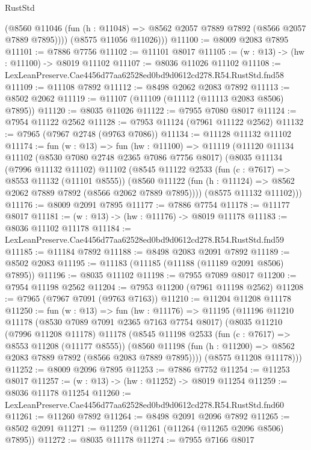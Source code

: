 \begin{lexlean}{RustStd}
\begin{coremodule}
          (@8560 @11046 (fun (h : @11048) => @8562 @2057 @7889 @7892 (@8566 @2057 @7889 @7895))))
        (@8575 @11056 @11026)))
@11100 := @8009 @2083 @7895
@11101 := @7886 @7756
@11102 := @11101 @8017
@11105 := (w : @13) -> (hw : @11100) -> @8019 @11102
@11107 := @8036 @11026 @11102
@11108 := LexLeanPreserve.Cae4456d77aa62528ed0bd9d0612cd278.R54.RustStd.fnd58
@11109 := @11108 @7892
@11112 := @8498 @2062 @2083 @7892
@11113 := @8502 @2062
@11119 := @11107 (@11109 (@11112 (@11113 @2083 @8506) @7895))
@11120 := @8035 @11026
@11122 := @7955 @7080 @8017
@11124 := @7954 @11122 @2562
@11128 := @7953 @11124 (@7961 @11122 @2562)
@11132 := @7965 (@7967 @2748 (@9763 @7086))
@11134 := @11128 @11132 @11102
@11174 := fun (w : @13) =>
  fun (hw : @11100) =>
  @11119
    (@11120
      @11134
      @11102
      (@8530 @7080 @2748 @2365 @7086 @7756 @8017)
      (@8035
        @11134
        (@7996 @11132 @11102)
        @11102
        (@8545
          @11122
          @2533
          (fun (c : @7617) => @8553 @11132 (@11101 @8555))
          (@8560 @11122 (fun (h : @11124) => @8562 @2062 @7889 @7892 (@8566 @2062 @7889 @7895))))
        (@8575 @11132 @11102)))
@11176 := @8009 @2091 @7895
@11177 := @7886 @7754
@11178 := @11177 @8017
@11181 := (w : @13) -> (hw : @11176) -> @8019 @11178
@11183 := @8036 @11102 @11178
@11184 := LexLeanPreserve.Cae4456d77aa62528ed0bd9d0612cd278.R54.RustStd.fnd59
@11185 := @11184 @7892
@11188 := @8498 @2083 @2091 @7892
@11189 := @8502 @2083
@11195 := @11183 (@11185 (@11188 (@11189 @2091 @8506) @7895))
@11196 := @8035 @11102
@11198 := @7955 @7089 @8017
@11200 := @7954 @11198 @2562
@11204 := @7953 @11200 (@7961 @11198 @2562)
@11208 := @7965 (@7967 @7091 (@9763 @7163))
@11210 := @11204 @11208 @11178
@11250 := fun (w : @13) =>
  fun (hw : @11176) =>
  @11195
    (@11196
      @11210
      @11178
      (@8530 @7089 @7091 @2365 @7163 @7754 @8017)
      (@8035
        @11210
        (@7996 @11208 @11178)
        @11178
        (@8545
          @11198
          @2533
          (fun (c : @7617) => @8553 @11208 (@11177 @8555))
          (@8560 @11198 (fun (h : @11200) => @8562 @2083 @7889 @7892 (@8566 @2083 @7889 @7895))))
        (@8575 @11208 @11178)))
@11252 := @8009 @2096 @7895
@11253 := @7886 @7752
@11254 := @11253 @8017
@11257 := (w : @13) -> (hw : @11252) -> @8019 @11254
@11259 := @8036 @11178 @11254
@11260 := LexLeanPreserve.Cae4456d77aa62528ed0bd9d0612cd278.R54.RustStd.fnd60
@11261 := @11260 @7892
@11264 := @8498 @2091 @2096 @7892
@11265 := @8502 @2091
@11271 := @11259 (@11261 (@11264 (@11265 @2096 @8506) @7895))
@11272 := @8035 @11178
@11274 := @7955 @7166 @8017

\end{coremodule}
\end{lexlean}
